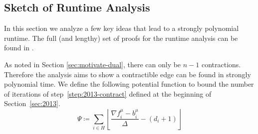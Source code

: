 \documentclass[11pt]{article}
\let\comment\todo
\newcommand{\tocut}[1]{\comment[nolist,color=yellow!40]{#1}}
\theoremstyle{definition}
\theoremstyle{definition}
\theoremstyle{definition}
\newcommand{\fu}{f^{\mu}}
\newcommand{\nfiu}{\nabla \fu_i}
\newcommand{\biu}{b_{i}^{\mu}}
\newcommand{\es}{\textsc{Elementary-Step}}
\newcommand{\rewrite}[1]{\textcolor{red}{#1}}
\renewcommand{\todo}[1]{\hl{TODO: #1}}
\begin{document}

\subsection{Sketch of Runtime Analysis} \label{sec:runtime2013}
In this section we analyze a few key ideas that lead to a strongly polynomial
runtime. The full (and lengthy) set of proofs for the runtime analysis can be
found in \cite{article}.



As noted in Section \ref{sec:motivate-dual}, there can only be $n-1$ contractions. Therefore
the analysis aims to show a contractible edge can be found in strongly polynomial time.
We define the following potential function to bound the number of iterations of
step~\ref{step:2013-contract} defined at the beginning of Section~\ref{sec:2013}.
\[ \Psi \coloneqq \sum_{i \in H} \left\lfloor \frac{\nfiu - \biu}{\Delta} - (d_i + 1) \right\rfloor \]
\end{document}
